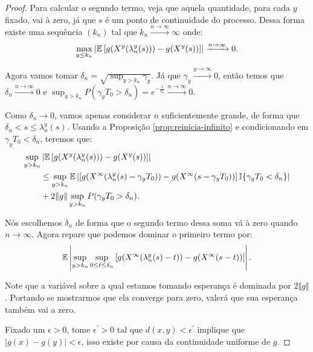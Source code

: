 \begin{proof}
  Para calcular o segundo termo, veja que aquela quantidade, para cada
  $y$ fixado, vai à zero, já que $s$ é \qc um ponto de continuidade do
  processo. Dessa forma existe uma sequência $(k_n)$ tal que $k_n
  \xrightarrow{n\to\infty} \infty$ onde:
  \begin{displaymath}
      \max_{y \leq k_n} \left\lvert
      {\mathbb{E}} \left[g(X^y(\lambda_n^y(s))) - g(X^y(s)) \right]
    \right\rvert \xrightarrow{n\to \infty} 0.
  \end{displaymath}

  Agora vamos tomar $\delta_n = \sqrt{\sup_{y > k_n}\gamma_y}$. Já
  que $\gamma_y \xrightarrow{y\to\infty} 0$, então temos que $\delta_n
  \xrightarrow{n\to\infty} 0$ e  $\sup_{y > k_n} P(\gamma_y T_0 > \delta_n) = 
  e^{-\frac{1}{\delta_n}} \xrightarrow{n\to\infty} 0$.

  Como $\delta_n \to 0$, vamos apenas considerar $n$ suficientemente
  grande, de forma que $\delta_n < s \leq \lambda_n^y(s)$. Usando a Proposição
  \ref{prop:reinicia-infinito} e condicionando em $\gamma_yT_0 <
  \delta_n$, teremos que:
  \begin{align}
    \label{eq:markov-quase-la}
    \sup_{y > k_n}& \left\lvert {\mathbb{E}} \left[g(X^y(\lambda_n^y(s))) -
        g(X^y(s)) \right]
    \right\rvert \notag \\
    &\leq \sup_{y > k_n} {\mathbb{E}} \left\lvert
      \left[g(X^\infty(\lambda_n^y(s)-\gamma_yT_0)) -
        g(X^\infty(s-\gamma_yT_0)) \right] {\mathbb{I}}\{ \gamma_yT_0 <
      \delta_n \}
    \right\rvert\\
    &+ 2 \Vert g \Vert \sup_{y > k_n} P(\gamma_y T_0 > \delta_n).
    \notag
  \end{align}

  Nós escolhemos $\delta_n$ de forma que o segundo termo dessa soma vá
  à zero quando $n \to \infty$. Agora repare que podemos dominar o
  primeiro termo por:
  \begin{displaymath}
     {\mathbb{E}} \left\lvert \sup_{y > k_n}
      \sup_{0 \leq t \leq \delta_n} \left[
        g(X^\infty(\lambda_n^y(s)-t)) -
        g(X^\infty(s-t))
      \right] 
    \right\rvert.
  \end{displaymath}

  Note que a variável sobre a qual estamos tomando esperança é
  dominada por $2\Vert g \Vert$. Portando se mostrarmos que ela
  converge \qc para zero, valerá que sua esperança também vai a zero.

  Fixado um $\epsilon > 0$, tome $\epsilon^\prime > 0$ tal que $d(x, y) <
  \epsilon^\prime$ implique que $|g(x) - g(y)| < \epsilon$, isso
  existe por causa da continuidade uniforme de $g$.
 

\end{proof}
